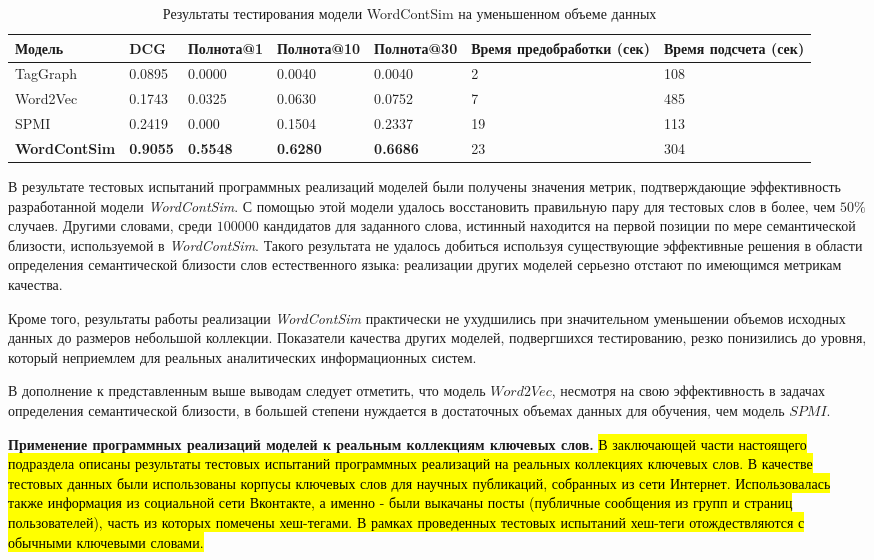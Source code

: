 \begin{table}[htb]
\tiny
\begin{tabularx}{16cm}{|Y|Y|Y|Y|Y|Y|Y|} 
        \hline
        Модель & DCG & Полнота@1 & Полнота@10 & Полнота@30 &  Время предобработки (сек) & Время подсчета (сек) \\ \hline
        TagGraph & 0.0895 & 0.0000 & 0.0040 & 0.0040 & 2 & 108 \\ \hline
        Word2Vec & 0.1743 & 0.0325 & 0.0630 & 0.0752 & 7 & 485  \\ \hline
        SPMI & 0.2419 & 0.000 & 0.1504 & 0.2337 & 19 & 113 \\ \hline
        \textbf{WordContSim} & \textbf{0.9055} & \textbf{0.5548} & \textbf{0.6280} & \textbf{0.6686} & 23 & 304 \\ \hline
\end{tabularx}
\vspace{0.2cm}

\caption[caption]{Результаты тестирования модели WordContSim на уменьшенном объеме данных } \label{tbl:word_test_2}
\end{table}

В результате тестовых испытаний программных реализаций моделей были получены значения метрик, подтверждающие эффективность разработанной модели \emph{WordContSim}. С помощью этой модели удалось восстановить правильную пару для тестовых слов в более, чем $50\%$ случаев. Другими словами, среди $100000$ кандидатов для заданного слова, истинный находится на первой позиции по мере семантической близости, используемой в \emph{WordContSim}. Такого результата не удалось добиться используя существующие эффективные решения в области определения семантической близости слов естественного языка: реализации других моделей серьезно отстают по имеющимся метрикам качества. 

Кроме того, результаты работы реализации \emph{WordContSim} практически не ухудшились при значительном уменьшении объемов исходных данных до размеров небольшой коллекции. Показатели качества других моделей, подвергшихся тестированию, резко понизились до уровня, который неприемлем для реальных аналитических информационных систем.

В дополнение к представленным выше выводам следует отметить, что модель $Word2Vec$, несмотря на свою эффективность в задачах определения семантической близости, в большей степени нуждается в достаточных объемах данных для обучения, чем модель $SPMI$.

\textbf{Применение программных реализаций моделей к реальным коллекциям ключевых слов.}
\hl{В заключающей части настоящего подраздела описаны результаты тестовых испытаний программных реализаций на реальных коллекциях ключевых слов. В качестве тестовых данных были использованы корпусы ключевых слов для научных публикаций, собранных из сети Интернет. Использовалась также информация из социальной сети Вконтакте, а именно - были выкачаны посты (публичные сообщения из групп и страниц пользователей), часть из которых помечены хеш-тегами. В рамках проведенных тестовых испытаний хеш-теги отождествляются с обычными ключевыми словами.}

